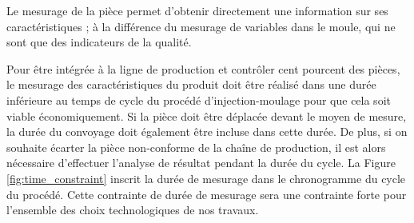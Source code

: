 %

Le mesurage de la pièce permet d'obtenir directement une information sur ses caractéristiques ; à la différence du mesurage de variables dans le moule, qui ne sont que des indicateurs de la qualité.

Pour être intégrée à la ligne de production et contrôler cent pourcent des pièces, le mesurage des caractéristiques du produit doit être réalisé dans une durée inférieure au temps de cycle du procédé d'injection-moulage pour que cela soit viable économiquement.
Si la pièce doit être déplacée devant le moyen de mesure, la durée du convoyage doit également être incluse dans cette durée.
De plus, si on souhaite écarter la pièce non-conforme de la chaîne de production, il est alors nécessaire d'effectuer l'analyse de résultat pendant la durée du cycle.
La Figure \ref{fig:time_constraint} inscrit la durée de mesurage dans le chronogramme du cycle du procédé.  %
Cette contrainte de durée de mesurage sera une contrainte forte pour l'ensemble des choix technologiques de nos travaux.

